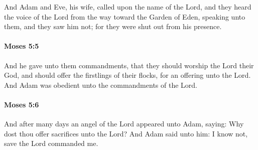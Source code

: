 			And Adam and Eve, his wife, called upon the name of the Lord, and they heard the voice of the Lord from the way toward the Garden of Eden, speaking unto them, and they saw him not; for they were shut out from his presence.


		\paragraph{Moses 5:5} %
			\label{MOSES-5-5}

			And he gave unto them commandments, that they should worship the Lord their God, and should offer the firstlings of their flocks, for an offering unto the Lord. And Adam was obedient unto the commandments of the Lord.


		\paragraph{Moses 5:6} %
			\label{MOSES-5-6}

			And after many days an angel of the Lord appeared unto Adam, saying: Why dost thou offer sacrifices unto the Lord? And Adam said unto him: I know not, save the Lord commanded me.


